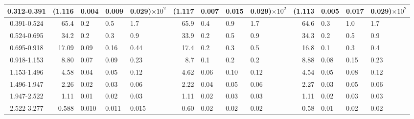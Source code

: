 \begin{table}[!htbp]
{\begin{tabular}{ | c | r@{$\pm$}l@{$\pm$}l@{$\pm$}l | r@{$\pm$}l@{$\pm$}l@{$\pm$}l | r@{$\pm$}l@{$\pm$}l@{$\pm$}l |}
0.312-0.391 & (1.116&0.004&0.009&0.029)$\times 10^{2}$ & (1.117&0.007&0.015&0.029)$\times 10^{2}$ & (1.113&0.005&0.017&0.029)$\times 10^{2}$ \\ \hline
0.391-0.524 & 65.4&0.2&0.5&1.7 & 65.9&0.4&0.9&1.7 & 64.6&0.3&1.0&1.7 \\ \hline
0.524-0.695 & 34.2&0.2&0.3&0.9 & 33.9&0.2&0.5&0.9 & 34.3&0.2&0.5&0.9 \\ \hline
0.695-0.918 & 17.09&0.09&0.16&0.44 & 17.4&0.2&0.3&0.5 & 16.8&0.1&0.3&0.4 \\ \hline
0.918-1.153 & 8.80&0.07&0.09&0.23 & 8.7&0.1&0.2&0.2 & 8.88&0.08&0.15&0.23 \\ \hline
1.153-1.496 & 4.58&0.04&0.05&0.12 & 4.62&0.06&0.10&0.12 & 4.54&0.05&0.08&0.12 \\ \hline
1.496-1.947 & 2.26&0.02&0.03&0.06 & 2.22&0.04&0.05&0.06 & 2.27&0.03&0.05&0.06 \\ \hline
1.947-2.522 & 1.11&0.01&0.02&0.03 & 1.11&0.02&0.03&0.03 & 1.11&0.02&0.03&0.03 \\ \hline
2.522-3.277 & 0.588&0.010&0.011&0.015 & 0.60&0.02&0.02&0.02 & 0.58&0.01&0.02&0.02 \\ \hline
\end{tabular}}
\end{table}
\clearpage
